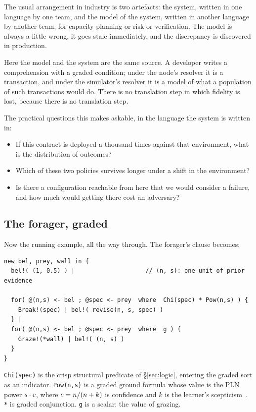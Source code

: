 The usual arrangement in industry is two artefacts: the system, written in one
language by one team, and the model of the system, written in another language
by another team, for capacity planning or risk or verification. The model is
always a little wrong, it goes stale immediately, and the discrepancy is
discovered in production.

Here the model and the system are the same source. A developer writes a
comprehension with a graded condition; under the node's resolver it is a
transaction, and under the simulator's resolver it is a model of what a
population of such transactions would do. There is no translation step in which
fidelity is lost, because there is no translation step.

The practical questions this makes askable, in the language the system is
written in:

\begin{itemize}[leftmargin=1.6em,itemsep=2pt]
\item If this contract is deployed a thousand times against that environment,
  what is the distribution of outcomes?
\item Which of these two policies survives longer under a shift in the
  environment?
\item Is there a configuration reachable from here that we would consider a
  failure, and how much would getting there cost an adversary?
\end{itemize}

\subsection{The forager, graded}

Now the running example, all the way through. The forager's clause becomes:

\begin{lstlisting}
new bel, prey, wall in {
  bel!( (1, 0.5) ) |                    // (n, s): one unit of prior evidence

  for( @(n,s) <- bel ; @spec <- prey  where  Chi(spec) * Pow(n,s) ) {
    Break!(spec) | bel!( revise(n, s, spec) )
  } |
  for( @(n,s) <- bel ; @spec <- prey  where  g ) {
    Graze!(*wall) | bel!( (n, s) )
  }
}
\end{lstlisting}

\texttt{Chi(spec)} is the crisp structural predicate of \S\ref{sec:logic},
entering the graded sort as an indicator. \texttt{Pow(n,s)} is a graded ground
formula whose value is the PLN power $s \cdot c$, where $c = n/(n+k)$
is confidence and $k$ is the learner's scepticism~\cite{PLN}. \texttt{*} is graded
conjunction. \texttt{g} is a scalar: the value of grazing.

